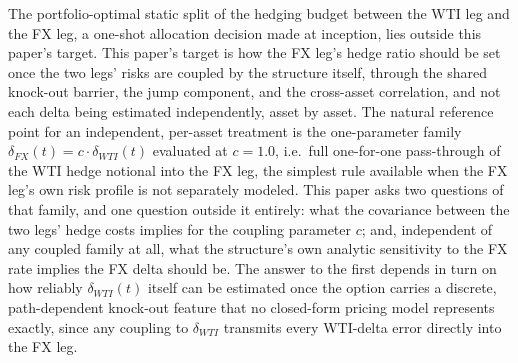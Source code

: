 \documentclass[11pt,a4paper]{article}
\begin{document}
The portfolio-optimal static split of the hedging budget between the WTI leg and the FX leg, a one-shot allocation decision made at inception, lies outside this paper's target. This paper's target is how the FX leg's hedge ratio should be set once the two legs' risks are coupled by the structure itself, through the shared knock-out barrier, the jump component, and the cross-asset correlation, and not each delta being estimated independently, asset by asset. The natural reference point for an independent, per-asset treatment is the one-parameter family $\delta_{FX}(t) = c\cdot\delta_{WTI}(t)$ evaluated at $c=1.0$, i.e.\ full one-for-one pass-through of the WTI hedge notional into the FX leg, the simplest rule available when the FX leg's own risk profile is not separately modeled. This paper asks two questions of that family, and one question outside it entirely: what the covariance between the two legs' hedge costs implies for the coupling parameter $c$; and, independent of any coupled family at all, what the structure's own analytic sensitivity to the FX rate implies the FX delta should be. The answer to the first depends in turn on how reliably $\delta_{WTI}(t)$ itself can be estimated once the option carries a discrete, path-dependent knock-out feature that no closed-form pricing model represents exactly, since any coupling to $\delta_{WTI}$ transmits every WTI-delta error directly into the FX leg.
\end{document}
